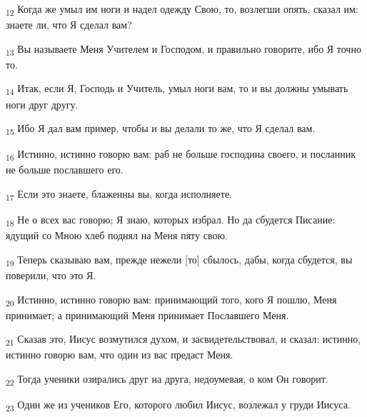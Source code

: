 \begin{tcolorbox}
\textsubscript{12} Когда же умыл им ноги и надел одежду Свою, то, возлегши опять, сказал им: знаете ли, что Я сделал вам?
\end{tcolorbox}
\begin{tcolorbox}
\textsubscript{13} Вы называете Меня Учителем и Господом, и правильно говорите, ибо Я точно то.
\end{tcolorbox}
\begin{tcolorbox}
\textsubscript{14} Итак, если Я, Господь и Учитель, умыл ноги вам, то и вы должны умывать ноги друг другу.
\end{tcolorbox}
\begin{tcolorbox}
\textsubscript{15} Ибо Я дал вам пример, чтобы и вы делали то же, что Я сделал вам.
\end{tcolorbox}
\begin{tcolorbox}
\textsubscript{16} Истинно, истинно говорю вам: раб не больше господина своего, и посланник не больше пославшего его.
\end{tcolorbox}
\begin{tcolorbox}
\textsubscript{17} Если это знаете, блаженны вы, когда исполняете.
\end{tcolorbox}
\begin{tcolorbox}
\textsubscript{18} Не о всех вас говорю; Я знаю, которых избрал. Но да сбудется Писание: ядущий со Мною хлеб поднял на Меня пяту свою.
\end{tcolorbox}
\begin{tcolorbox}
\textsubscript{19} Теперь сказываю вам, прежде нежели [то] сбылось, дабы, когда сбудется, вы поверили, что это Я.
\end{tcolorbox}
\begin{tcolorbox}
\textsubscript{20} Истинно, истинно говорю вам: принимающий того, кого Я пошлю, Меня принимает; а принимающий Меня принимает Пославшего Меня.
\end{tcolorbox}
\begin{tcolorbox}
\textsubscript{21} Сказав это, Иисус возмутился духом, и засвидетельствовал, и сказал: истинно, истинно говорю вам, что один из вас предаст Меня.
\end{tcolorbox}
\begin{tcolorbox}
\textsubscript{22} Тогда ученики озирались друг на друга, недоумевая, о ком Он говорит.
\end{tcolorbox}
\begin{tcolorbox}
\textsubscript{23} Один же из учеников Его, которого любил Иисус, возлежал у груди Иисуса.
\end{tcolorbox}
